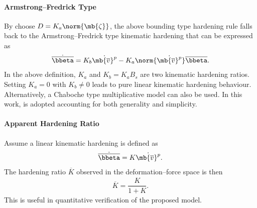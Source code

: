 \paragraph{Armstrong--Fredrick Type}
By choose $D=K_a\norm{\mb{\zeta}}$, the above bounding type hardening rule falls back to the Armstrong--Fredrick type \cite{Frederick2007} kinematic hardening that can be expressed as
\begin{gather}\label{eq:nm_kin}
\dot{\overline{\bbeta}}=K_b\dot{\mb{\overline{v}}^p}-K_a\norm{\dot{\mb{\overline{v}}^p}}\overline{\bbeta}.
\end{gather}
In the above definition, $K_a$ and $K_b=K_aB_s$ are two kinematic hardening ratios. Setting $K_a=0$ with $K_b\neq0$ leads to pure linear kinematic hardening behaviour. Alternatively, a Chaboche type multiplicative model \cite{Chaboche1989} can also be used. In this work,  is adopted accounting for both generality and simplicity.
\paragraph{Apparent Hardening Ratio}
Assume a linear kinematic hardening is defined as
\begin{gather}
\dot{\overline{\bbeta}}=K\dot{\mb{\overline{v}}^p}.
\end{gather}
The hardening ratio $\overline{K}$ observed in the deformation--force space is then \cite{Simo1998}
\begin{gather}\label{eq:nm_eqv_kin_hardening}
\overline{K}=\dfrac{K}{1+K}.
\end{gather}
This is useful in quantitative verification of the proposed model.

